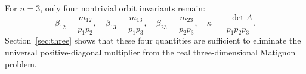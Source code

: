 For \(n=3\), only four nontrivial orbit invariants remain:
\begin{equation}
 \boxed{
 \beta_{12}=\frac{m_{12}}{p_1p_2},\quad
 \beta_{13}=\frac{m_{13}}{p_1p_3},\quad
 \beta_{23}=\frac{m_{23}}{p_2p_3},\quad
 \kappa=\frac{-\det A}{p_1p_2p_3}.
 }
 \label{eq:four-invariants}
\end{equation}
Section~\ref{sec:three} shows that these four quantities are sufficient to eliminate the universal positive-diagonal multiplier from the real three-dimensional Matignon problem.
